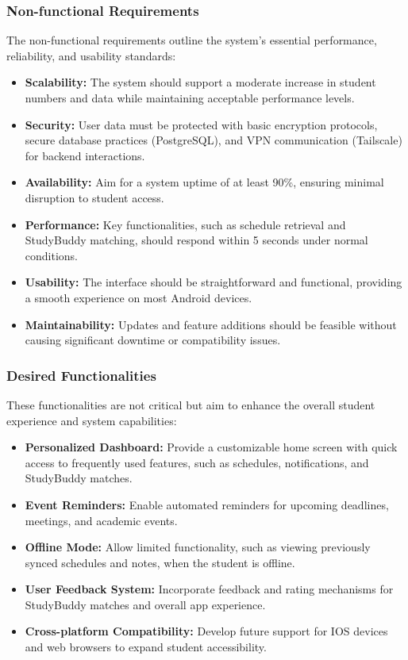 \documentclass{article}
\begin{document}
\subsubsection{Non-functional Requirements}
The non-functional requirements outline the system's essential performance, reliability, and usability standards:  
\begin{itemize}  
    \item \textbf{Scalability:} The system should support a moderate increase in student numbers and data while maintaining acceptable performance levels.  
    \item \textbf{Security:} User data must be protected with basic encryption protocols, secure database practices (PostgreSQL), and VPN communication (Tailscale) for backend interactions.  
    \item \textbf{Availability:} Aim for a system uptime of at least 90\%, ensuring minimal disruption to student access.  
    \item \textbf{Performance:} Key functionalities, such as schedule retrieval and StudyBuddy matching, should respond within 5 seconds under normal conditions.  
    \item \textbf{Usability:} The interface should be straightforward and functional, providing a smooth experience on most Android devices.  
    \item \textbf{Maintainability:} Updates and feature additions should be feasible without causing significant downtime or compatibility issues.  
\end{itemize}  

\subsubsection{Desired Functionalities}
These functionalities are not critical but aim to enhance the overall student experience and system capabilities:  
\begin{itemize}  
    \item \textbf{Personalized Dashboard:} Provide a customizable home screen with quick access to frequently used features, such as schedules, notifications, and StudyBuddy matches.  
    \item \textbf{Event Reminders:} Enable automated reminders for upcoming deadlines, meetings, and academic events.  
    \item \textbf{Offline Mode:} Allow limited functionality, such as viewing previously synced schedules and notes, when the student is offline.  
    \item \textbf{User Feedback System:} Incorporate feedback and rating mechanisms for StudyBuddy matches and overall app experience.  
    \item \textbf{Cross-platform Compatibility:} Develop future support for IOS devices and web browsers to expand student accessibility.  
\end{itemize}  
\end{document}
